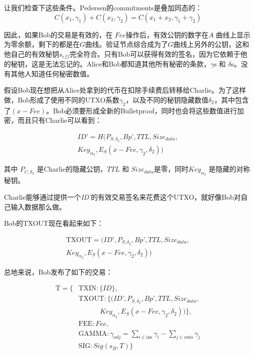 \documentclass[8pt,fleqn,openany]{book}
\begin{document}
\begin{CJK*}{UTF8}{gbsn}
{让我们检查下这些条件。Pedersen的commitments是叠加同态的：
$$C(x_1, \gamma_1) + C(x_2, \gamma_2) = C(x_1 + x_2, \gamma_1 + \gamma_2)$$

因此，如果Bob的交易是有效的，在 $\mathit{Fee}$操作后，有效公钥的数字在$A$ 曲线上显示为零余额，剩下的都是在$G$曲线。验证节点综合成为了$G$曲线上另外的公钥，这和他自己的有效秘钥$s_{\mathit{eff}}$完全符合。只有Bob可以获得有效的签名，因为它依赖于他的秘钥，这是无法忘记的。Alice和Bob都知道其他所有秘密的条款，$\gamma$s 和 $\delta$s。没有其他人知道任何秘密数值。

假设Bob现在想把从Alice处拿到的代币在扣除手续费后转移给Charlie。为了这样做，Bob形成了使用不同的UTXO系数$\gamma_2$，以及不同的秘钥隐藏数值$\delta_2$，其中包含了$(x - \mathit{Fee})$。Bob必须要形成全新的Bulletproof，同时也会将这些数值进行加密，而且只有Charlie可以看到：

\begin{multline*}
ID’ = H(P_{S, \delta_2}, Bp’, TTL, Size_{data}, \\
Key_{\alpha_2}, E_S(x - Fee, \gamma_2, \delta_2))
\end{multline*}

其中 $P_{C, \delta_2}$ 是Charlie的隐藏公钥，$TTL$ 和 $Size_{data}$是零，同时$Key_{\alpha_2}$ 是隐藏的对称秘钥。

Charlie能够通过提供一个\textit{ID’}的有效交易签名来花费这个UTXO，就好像Bob对自己输入数据那么做。

Bob的TXOUT现在看起来如下：

\begin{multline*}
\text{TXOUT} = (ID’, P_{S, \delta_2}, Bp’, TTL, Size_{data},\\ 
Key_{\alpha_2}, E_S(x - Fee, \gamma_2, \delta_2))
\end{multline*}

总地来说，Bob发布了如下的交易：

\begin{align*}
\text{T} = \{&\text{TXIN} : \{\mathit{ID}\}, \\
&\text{TXOUT} : \{(ID’, P_{S, \delta_2}, Bp’, TTL, Size_{data}, \\
& \ \ \ \ \ \ \ \ \ \ \ \ \ \ Key_{\alpha_2}, E_S(x - Fee, \gamma_2, \delta_2))\}, \\
&\text{FEE} : \mathit{Fee}, \\
&\text{GAMMA} : \gamma_{\mathit{adj}} = \sum_{i \in \text{ins}}{\gamma_i} - \sum_{j \in \text{outs}}{\gamma_j}\\
&\text{SIG} : \mathit{Sig}(s_B, T)\}
\end{align*}

}
\end{CJK*}
\end{document}
